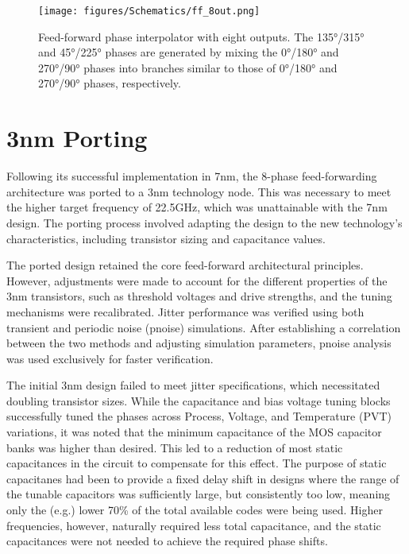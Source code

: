 \begin{figure}[H]
  \centering
  \texttt{[image: figures/Schematics/ff\_8out.png]}
  \caption{Feed-forward phase interpolator with eight outputs. The \ang{135}/\ang{315} and \ang{45}/\ang{225} phases are generated by mixing the \ang{0}/\ang{180} and \ang{270}/\ang{90} phases into branches similar to those of \ang{0}/\ang{180} and \ang{270}/\ang{90} phases, respectively.}
  \label{fig:FF_8out}
\end{figure}

\section{3nm Porting}\label{sec:3nm_porting}

Following its successful implementation in 7nm, the 8-phase feed-forwarding architecture was ported to a 3nm technology node. This was necessary to meet the higher target frequency of 22.5GHz, which was unattainable with the 7nm design. The porting process involved adapting the design to the new technology's characteristics, including transistor sizing and capacitance values.

The ported design retained the core feed-forward architectural principles. However, adjustments were made to account for the different properties of the 3nm transistors, such as threshold voltages and drive strengths, and the tuning mechanisms were recalibrated. Jitter performance was verified using both transient and periodic noise (pnoise) simulations. After establishing a correlation between the two methods and adjusting simulation parameters, pnoise analysis was used exclusively for faster verification.

The initial 3nm design failed to meet jitter specifications, which necessitated doubling transistor sizes. While the capacitance and bias voltage tuning blocks successfully tuned the phases across Process, Voltage, and Temperature (PVT) variations, it was noted that the minimum capacitance of the MOS capacitor banks was higher than desired. This led to a reduction of most static capacitances in the circuit to compensate for this effect. The purpose of static capacitanes had been to provide a fixed delay shift in designs where the range of the tunable capacitors was sufficiently large, but consistently too low, meaning only the (e.g.) lower 70\% of the total available codes were being used. Higher frequencies, however, naturally required less total capacitance, and the static capacitances were not needed to achieve the required phase shifts. 

